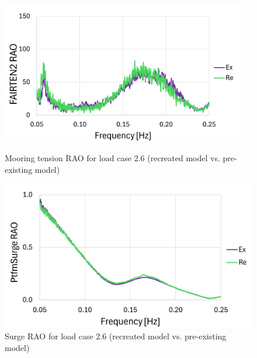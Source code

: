 \documentclass[a4paper, 11pt]{article}
\begin{document}
\begin{figure}[H]
    \begin{minipage}{0.48\textwidth}
        \centering
        \includegraphics[width=0.95\textwidth]{2.6_ten_mine_1.png}
        \caption{\small Mooring tension RAO for load case 2.6 (recreated model vs. pre-existing model)}
        \label{fig:2.6_ten_mine_recreated}
    \end{minipage}
    \hfill
    \begin{minipage}{0.48\textwidth}
        \centering
        \includegraphics[width=1\textwidth]{2.6_surge_mine_1.png}
        \caption{\small Surge RAO for load case 2.6 (recreated model vs. pre-existing model)} 
        \label{fig:2.6_surge_mine_recreated}
    \end{minipage}
\end{figure}
\end{document}
